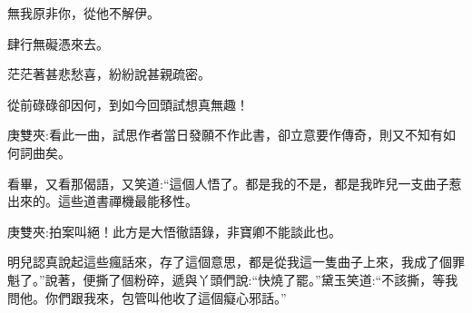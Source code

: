 \begin{poem}
    \begin{pl}無我原非你，從他不解伊。\end{pl}

    \begin{pl}肆行無礙憑來去。\end{pl}

    \begin{pl}茫茫著甚悲愁喜，紛紛說甚親疏密。\end{pl}

    \begin{pl}從前碌碌卻因何，到如今回頭試想真無趣！\end{pl}
    \begin{note}庚雙夾:看此一曲，試思作者當日發願不作此書，卻立意要作傳奇，則又不知有如何詞曲矣。\end{note}
\end{poem}


\begin{parag}
    看畢，又看那偈語，又笑道:“這個人悟了。都是我的不是，都是我昨兒一支曲子惹出來的。這些道書禪機最能移性。\begin{note}庚雙夾:拍案叫絕！此方是大悟徹語錄，非寶卿不能談此也。\end{note}明兒認真說起這些瘋話來，存了這個意思，都是從我這一隻曲子上來，我成了個罪魁了。”說著，便撕了個粉碎，遞與丫頭們說:“快燒了罷。”黛玉笑道:“不該撕，等我問他。你們跟我來，包管叫他收了這個癡心邪話。”
\end{parag}


